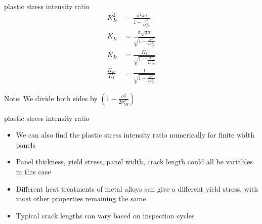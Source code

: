 \documentclass[
  letterpaper,
  ignorenonframetext,
  aspectratio=43,
  handout,
  12pt]{beamer}
\providecommand{\tightlist}{%
  \setlength{\itemsep}{0pt}\setlength{\parskip}{0pt}}
\providecommand{\tightlist}{%
\setlength{\itemsep}{0pt}\setlength{\parskip}{0pt}}
\begin{document}
\begin{frame}{plastic stress intensity ratio}
\protect\hypertarget{plastic-stress-intensity-ratio-3}{}
\[\begin{aligned}
  K_{Ie}^2 &= \frac{\sigma^2 \pi a}{1 - \frac{\sigma^2}{2 \sigma_{YS}^2}}\\
  K_{Ie} &= \frac{\sigma \sqrt{\pi a}}{\sqrt{1 - \frac{\sigma^2}{2 \sigma_{YS}^2}}}\\
  K_{Ie} &= \frac{K_I}{\sqrt{1 - \frac{\sigma^2}{2 \sigma_{YS}^2}}}\\
  \frac{K_{Ie}}{K_I} &= \frac{1}{\sqrt{1 - \frac{\sigma^2}{2 \sigma_{YS}^2}}}
\end{aligned}\]

Note: We divide both sides by
\(\left(1 - \frac{\sigma^2}{2 \sigma_{YS}^2}\right)\)
\end{frame}

\begin{frame}{plastic stress intensity ratio}
\protect\hypertarget{plastic-stress-intensity-ratio-4}{}
\begin{itemize}
\tightlist
\item
  We can also find the plastic stress intensity ratio numerically for
  finite width panels
\item
  Panel thickness, yield stress, panel width, crack length could all be
  variables in this case
\item
  Different heat treatments of metal alloys can give a different yield
  stress, with most other properties remaining the same
\item
  Typical crack lengths can vary based on inspection cycles
\end{itemize}
\end{frame}
\end{document}
